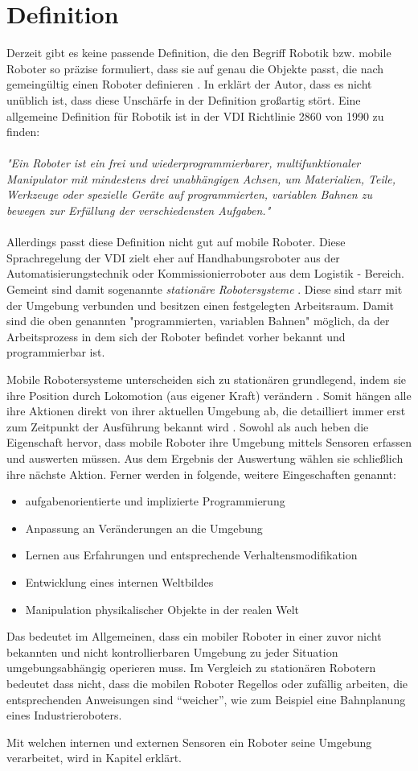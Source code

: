 \section{Definition}
Derzeit gibt es keine passende Definition, die den Begriff Robotik bzw. mobile Roboter so präzise formuliert, dass sie auf genau die Objekte passt, die nach gemeingültig einen Roboter definieren \cite{hertzberg2009mobile}. In \cite{hertzberg2009mobile} erklärt der Autor, dass es nicht unüblich ist, dass diese Unschärfe in der Definition großartig stört. Eine allgemeine Definition für Robotik ist in der \ac{VDI} Richtlinie 2860 von 1990 zu finden:
\\
\\
\textit{"Ein Roboter ist ein frei und wiederprogrammierbarer, multifunktionaler Manipulator mit mindestens drei unabhängigen Achsen, um Materialien, Teile, Werkzeuge oder spezielle Geräte auf programmierten,
variablen Bahnen zu bewegen zur Erfüllung der verschiedensten Aufgaben."}
\\
\\
Allerdings passt diese Definition nicht gut auf mobile Roboter. Diese Sprachregelung der \ac{VDI} zielt eher auf Handhabungsroboter aus der Automatisierungstechnik oder Kommissionierroboter aus dem Logistik - Bereich. Gemeint sind damit sogenannte \textit{stationäre Robotersysteme} \cite{Haun2007}. Diese sind starr mit der Umgebung verbunden und besitzen einen festgelegten Arbeitsraum. Damit sind die oben genannten "programmierten, variablen Bahnen" möglich, da der Arbeitsprozess in dem sich der Roboter befindet vorher bekannt und programmierbar ist. 

Mobile Robotersysteme unterscheiden sich zu stationären grundlegend, indem sie ihre Position durch Lokomotion (aus eigener Kraft) verändern \cite{Haun2007}. Somit hängen alle ihre Aktionen direkt von ihrer aktuellen Umgebung ab, die detailliert immer erst zum Zeitpunkt der Ausführung bekannt wird \cite{hertzberg2009mobile}. Sowohl \cite{hertzberg2009mobile} als auch \cite{Haun2007} heben die Eigenschaft hervor, dass mobile Roboter ihre Umgebung mittels Sensoren erfassen und auswerten müssen. Aus dem Ergebnis der Auswertung wählen sie schließlich ihre nächste Aktion. Ferner werden in \cite{Haun2007} folgende, weitere Eingeschaften genannt:
\begin{itemize}
\item aufgabenorientierte und implizierte Programmierung
\item Anpassung an Veränderungen an die Umgebung
\item Lernen aus Erfahrungen und entsprechende Verhaltensmodifikation
\item Entwicklung eines internen Weltbildes
\item Manipulation physikalischer Objekte in der realen Welt
\end{itemize}
Das bedeutet im Allgemeinen, dass ein mobiler Roboter in einer zuvor nicht bekannten und nicht kontrollierbaren Umgebung zu jeder Situation umgebungsabhängig operieren muss. Im Vergleich zu stationären Robotern bedeutet dass nicht, dass die mobilen Roboter Regellos oder zufällig arbeiten, die entsprechenden Anweisungen sind "`weicher"', wie zum Beispiel eine Bahnplanung eines Industrieroboters.

Mit welchen internen und externen Sensoren ein Roboter seine Umgebung verarbeitet, wird in Kapitel  erklärt.

